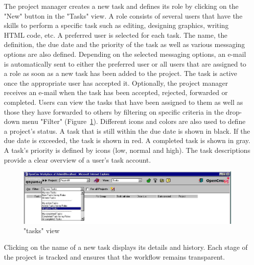 The project manager creates a new task and defines its role by
clicking on the "New" button in the "Tasks" view. A role consists
of several users that have the skills to perform a specific task
such as editing, designing graphics, writing HTML code, etc. A
preferred user is selected for each task. The name, the
definition, the due date and the priority of the task as well as
various messaging options are also defined. Depending on the
selected messaging options, an e-mail is automatically sent to
either the preferred user or all users that are assigned to a role
as soon as a new task has been added to the project. The task is
active once the appropriate user has accepted it. Optionally, the
project manager receives an e-mail when the task has been
accepted, rejected, forwarded or completed. Users can view the
tasks that have been assigned to them as well as those they have
forwarded to others by filtering on specific criteria in the
drop-down menu "Filter" (Figure~\ref{taskview}). Different icons
and colors are also used to define a project's status. A task that
is still within the due date is shown in black. If the due date is
exceeded, the task is shown in red. A completed task is shown in
gray. A task's priority is defined by icons (low, normal and
high). The task descriptions provide a clear overview of a user's
task account.

\begin{figure}[hbt]
\begin{center}
\includegraphics[width=\sgw]
                   {pics/usermanual/taskView}
\caption["tasks" view]
           {"tasks" view}
\label{taskview}
\end{center}
\end{figure}

Clicking on the name of a new task displays its details and
history. Each stage of the project is tracked and ensures that the
workflow remains transparent.
